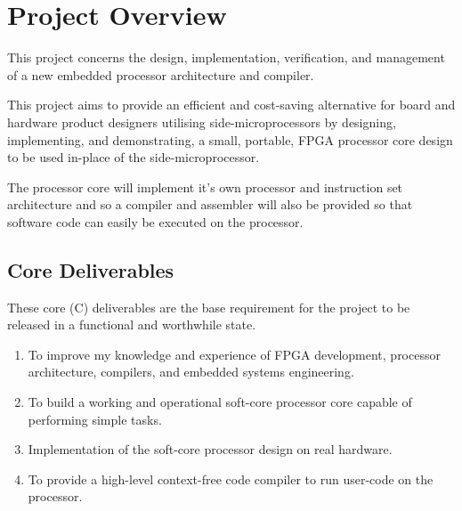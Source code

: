 \documentclass[11pt,a4paper]{report}
\begin{document}
\newpage

\section{Project Overview}
This project concerns the design, implementation, verification, and management of a new embedded processor architecture and compiler.

This project aims to provide an efficient and cost-saving alternative for board and hardware product designers utilising side-microprocessors by designing, implementing, and demonstrating, a small, portable, FPGA processor core design to be used in-place of the side-microprocessor. 

The processor core will implement it's own processor and instruction set architecture and so a compiler and assembler will also be provided so that software code can easily be executed on the processor.

\subsection{Core Deliverables}
These core (C) deliverables are the base requirement for the project to be released in a functional and worthwhile state.
\begin{enumerate}[label=\bfseries C\arabic*.]
\item{To improve my knowledge and experience of FPGA development, processor architecture, compilers, and embedded systems engineering.}
\item{To build a working and operational soft-core processor core capable of performing simple tasks.}
\item{Implementation of the soft-core processor design on real hardware.}
\item{To provide a high-level context-free code compiler to run user-code on the processor.}
\end{enumerate}

\end{document}
